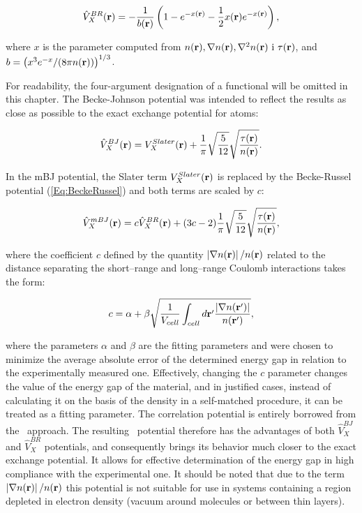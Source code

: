 \begin{equation}
    \label{Eq:BeckeRussel} 
    \hat{V}_X^{BR}(\mathbf{r})=-\frac{1}{b(\mathbf{r})}\left(1-e^{-x(\mathbf{r})}-\frac{1}{2}x(\mathbf{r})e^{-x(\mathbf{r})}\right),
\end{equation}

where $x$ is the parameter computed from $n(\mathbf{r}), \nabla n(\mathbf{r}), \nabla^2 n(\mathbf{r})\text{ i }\tau(\mathbf{r})$, and $b=\left(x^3e^{-x}/(8\pi n(\mathbf{r}))\right)^{1/3}$.

For readability, the four-argument designation of a functional will be omitted in this chapter.
The Becke-Johnson potential \cite{becke_johnson} was intended to reflect the results as close as possible to the exact exchange potential for atoms:

\begin{equation}
    \label{Eq:BeckeJohnson} 
    \hat{V}_X^{BJ}(\mathbf{r})=V_X^{Slater}(\mathbf{r})+\frac{1}{\pi}\sqrt{\frac{5}{12}}\sqrt{\frac{\tau(\mathbf{r})}{n(\mathbf{r})}}.
\end{equation}

In the mBJ potential, the Slater term $V_X^{Slater}(\mathbf{r})$ is replaced by the Becke-Russel potential (\ref{Eq:BeckeRussel}) and both terms are scaled by $c$:

\begin{equation}
    \label{Eq:mbjlda} 
    \hat{V}_X^{mBJ}(\mathbf{r})=c\hat{V}_X^{BR}(\mathbf{r})+(3c-2)\frac{1}{\pi}\sqrt{\frac{5}{12}}\sqrt{\frac{\tau(\mathbf{r})}{n(\mathbf{r})}},
\end{equation}

where the coefficient $ c $ defined by the quantity $\left|\nabla n(\mathbf{r})\right|/ n(\mathbf{r})$ related to the distance separating the short--range and long--range Coulomb interactions takes the form:

\begin{equation}
    \label{Eq:c_mbj}
    c=\alpha+\beta\sqrt{\frac{1}{V_{cell}}\int_{cell}d\mathbf{r'}\frac{\left|\nabla n(\mathbf{r'})\right|}{n(\mathbf{r'})}},
\end{equation}

where the parameters $\alpha$ and $\beta$ are the fitting parameters and were chosen to minimize the average absolute error of the determined energy gap in relation to the experimentally measured one.
Effectively, changing the $ c $ parameter changes the value of the energy gap of the material, and in justified cases, instead of calculating it on the basis of the density in a self-matched procedure, it can be treated as a fitting parameter.
The correlation potential is entirely borrowed from the \LDA\ approach.
The resulting \mBJLDA\ potential therefore has the advantages of both $\hat{V}_X^{BJ}$ and $\hat{V}_X^{BR}$ potentials, and consequently brings its behavior much closer to the exact exchange potential.
It allows for effective determination of the energy gap in high compliance with the experimental one.
It should be noted that due to the term $\left|\nabla n(\mathbf{r})\right|/ n(\mathbf{r})$ this potential is not suitable for use in systems containing a region depleted in electron density (vacuum around molecules or between thin layers).

